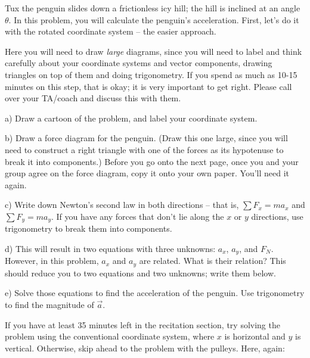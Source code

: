 \documentclass[12pt]{article}
\begin{document}
\newpage




Tux the penguin slides down a frictionless icy hill; the hill is inclined at an angle $\theta$. In this problem, you will 
calculate the penguin's acceleration. First, let's do it with the rotated coordinate system -- the easier approach.

Here you will need to draw {\it large} diagrams, since you will need to label and think carefully about your coordinate systems and vector components, drawing triangles on top of them and doing trigonometry. If you spend as much as 10-15 minutes on this step, that is okay; it is very important to get right. Please call over your TA/coach and discuss this with them.



\bigskip


a) Draw a cartoon of the problem, and label your coordinate system.


\vspace{2in}

	b) Draw a force diagram for the penguin. (Draw this one large, since you will need to construct a right triangle with one of the forces as its hypotenuse to break it into components.) Before you go onto the next page, once you and your group agree on the force diagram, copy it onto your own paper. You'll need it again.



\vspace{2in}


\newpage

c) Write down Newton's second law in both directions -- that is, $\sum F_x = ma_x$ and $\sum F_y = ma_y$. If you have any forces that don't lie along the $x$ or $y$ directions, use trigonometry to break them into components.

\vspace{1.7in}

d) This will result in two equations with three unknowns: $a_x$, $a_y$, and $F_N$. However, in this problem, $a_x$ and $a_y$ are related. What is their relation? This should reduce you to two equations and two unknowns; write them below.
\vspace{1.7in}

e) Solve those equations to find the acceleration of the penguin. Use trigonometry to find the magnitude of $\vec a$.

\newpage

If you have at least 35 minutes left in the recitation section, try solving the problem using the conventional coordinate system, where $x$ is horizontal and $y$ is vertical. Otherwise, skip ahead to the problem with the pulleys. Here, again:
\end{document}
